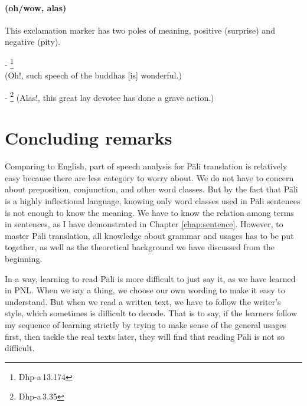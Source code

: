 \paragraph*{ (oh/wow, alas)} This exclamation marker has two poles of meaning, positive (surprise) and negative (pity).\par
- \footnote{Dhp-a\,13.174} \\(Oh!, such speech of the buddhas [is] wonderful.)\par 
- \footnote{Dhp-a\,3.35} (Alas!, this great lay devotee has done a grave action.)\par 

\section*{Concluding remarks}

Comparing to English, part of speech analysis for P\=ali translation is relatively easy because there are less category to worry about. We do not have to concern about preposition, conjunction, and other word classes. But by the fact that P\=ali is a highly inflectional language, knowing only word classes used in P\=ali sentences is not enough to know the meaning. We have to know the relation among terms in sentences, as I have demonstrated in Chapter \ref{chap:sentence}. However, to master P\=ali translation, all knowledge about grammar and usages has to be put together, as well as the theoretical background we have discussed from the beginning. 

In a way, learning to read P\=ali is more difficult to just say it, as we have learned in PNL. When we say a thing, we choose our own wording to make it easy to understand. But when we read a written text, we have to follow the writer's style, which sometimes is difficult to decode. That is to say, if the learners follow my sequence of learning strictly by trying to make sense of the general usages first, then tackle the real texts later, they will find that reading P\=ali is not so difficult.

